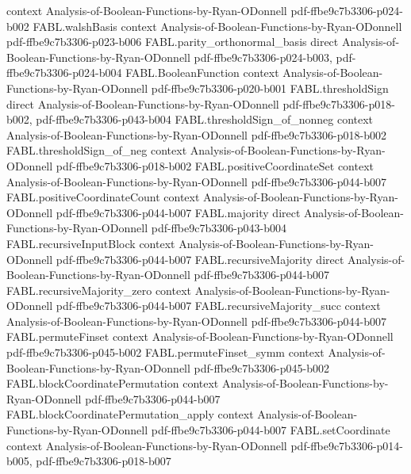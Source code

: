 \begin{theorem}
  {context}
  {Analysis-of-Boolean-Functions-by-Ryan-ODonnell}
  {pdf-ffbe9c7b3306-p024-b002}
\proofstep
  {FABL.walshBasis}
  {context}
  {Analysis-of-Boolean-Functions-by-Ryan-ODonnell}
  {pdf-ffbe9c7b3306-p023-b006}
\proofstep
  {FABL.parity_orthonormal_basis}
  {direct}
  {Analysis-of-Boolean-Functions-by-Ryan-ODonnell}
  {pdf-ffbe9c7b3306-p024-b003,
    pdf-ffbe9c7b3306-p024-b004}
\proofstep
  {FABL.BooleanFunction}
  {context}
  {Analysis-of-Boolean-Functions-by-Ryan-ODonnell}
  {pdf-ffbe9c7b3306-p020-b001}
\proofstep
  {FABL.thresholdSign}
  {direct}
  {Analysis-of-Boolean-Functions-by-Ryan-ODonnell}
  {pdf-ffbe9c7b3306-p018-b002,
    pdf-ffbe9c7b3306-p043-b004}
\proofstep
  {FABL.thresholdSign_of_nonneg}
  {context}
  {Analysis-of-Boolean-Functions-by-Ryan-ODonnell}
  {pdf-ffbe9c7b3306-p018-b002}
\proofstep
  {FABL.thresholdSign_of_neg}
  {context}
  {Analysis-of-Boolean-Functions-by-Ryan-ODonnell}
  {pdf-ffbe9c7b3306-p018-b002}
\proofstep
  {FABL.positiveCoordinateSet}
  {context}
  {Analysis-of-Boolean-Functions-by-Ryan-ODonnell}
  {pdf-ffbe9c7b3306-p044-b007}
\proofstep
  {FABL.positiveCoordinateCount}
  {context}
  {Analysis-of-Boolean-Functions-by-Ryan-ODonnell}
  {pdf-ffbe9c7b3306-p044-b007}
\proofstep
  {FABL.majority}
  {direct}
  {Analysis-of-Boolean-Functions-by-Ryan-ODonnell}
  {pdf-ffbe9c7b3306-p043-b004}
\proofstep
  {FABL.recursiveInputBlock}
  {context}
  {Analysis-of-Boolean-Functions-by-Ryan-ODonnell}
  {pdf-ffbe9c7b3306-p044-b007}
\proofstep
  {FABL.recursiveMajority}
  {direct}
  {Analysis-of-Boolean-Functions-by-Ryan-ODonnell}
  {pdf-ffbe9c7b3306-p044-b007}
\proofstep
  {FABL.recursiveMajority_zero}
  {context}
  {Analysis-of-Boolean-Functions-by-Ryan-ODonnell}
  {pdf-ffbe9c7b3306-p044-b007}
\proofstep
  {FABL.recursiveMajority_succ}
  {context}
  {Analysis-of-Boolean-Functions-by-Ryan-ODonnell}
  {pdf-ffbe9c7b3306-p044-b007}
\proofstep
  {FABL.permuteFinset}
  {context}
  {Analysis-of-Boolean-Functions-by-Ryan-ODonnell}
  {pdf-ffbe9c7b3306-p045-b002}
\proofstep
  {FABL.permuteFinset_symm}
  {context}
  {Analysis-of-Boolean-Functions-by-Ryan-ODonnell}
  {pdf-ffbe9c7b3306-p045-b002}
\proofstep
  {FABL.blockCoordinatePermutation}
  {context}
  {Analysis-of-Boolean-Functions-by-Ryan-ODonnell}
  {pdf-ffbe9c7b3306-p044-b007}
\proofstep
  {FABL.blockCoordinatePermutation_apply}
  {context}
  {Analysis-of-Boolean-Functions-by-Ryan-ODonnell}
  {pdf-ffbe9c7b3306-p044-b007}
\proofstep
  {FABL.setCoordinate}
  {context}
  {Analysis-of-Boolean-Functions-by-Ryan-ODonnell}
  {pdf-ffbe9c7b3306-p014-b005,
    pdf-ffbe9c7b3306-p018-b007}
\proofstep

\end{theorem}
